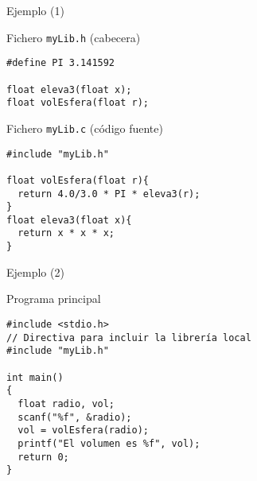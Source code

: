 \documentclass[xcolor={usenames,svgnames,dvipsnames}, aspectratio=169]{beamer}
\begin{document}
\begin{frame}[label={sec:org9dc3dd9},fragile]{Ejemplo (1)}
 \begin{block}{Fichero \texttt{myLib.h} (cabecera)}
\lstset{language=C,label= ,caption= ,captionpos=b,numbers=none}
\begin{lstlisting}
#define PI 3.141592

float eleva3(float x);
float volEsfera(float r);
\end{lstlisting}
\end{block}

\begin{block}{Fichero \texttt{myLib.c} (código fuente)}
\lstset{language=C,label= ,caption= ,captionpos=b,numbers=none}
\begin{lstlisting}
#include "myLib.h"

float volEsfera(float r){
  return 4.0/3.0 * PI * eleva3(r);
}
float eleva3(float x){
  return x * x * x;
}
\end{lstlisting}
\end{block}
\end{frame}

\begin{frame}[label={sec:orgaea0b84},fragile]{Ejemplo (2)}
 \begin{block}{Programa principal}
\lstset{language=C,label= ,caption= ,captionpos=b,numbers=none}
\begin{lstlisting}
#include <stdio.h>
// Directiva para incluir la librería local
#include "myLib.h" 

int main()
{
  float radio, vol;
  scanf("%f", &radio);
  vol = volEsfera(radio);
  printf("El volumen es %f", vol);
  return 0;
}
\end{lstlisting}
\end{block}
\end{frame}
\end{document}

